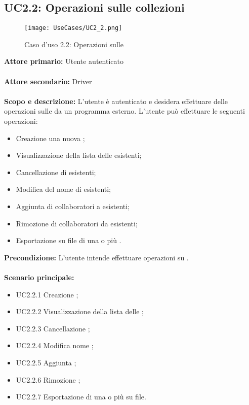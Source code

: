 \documentclass{scalatekids-article}
\begin{document}
\subsection{UC2.2: Operazioni sulle collezioni}

\begin{figure}[H]
  \begin{center}
    \texttt{[image: UseCases/UC2\_2.png]}
    \caption*{Caso d'uso 2.2: Operazioni sulle }
  \end{center}
\end{figure}
\textbf{Attore primario:} Utente autenticato\\ \\
\textbf{Attore secondario:} Driver\\ \\
\textbf{Scopo e descrizione:} L'utente è autenticato e desidera effettuare delle operazioni sulle  da un programma  esterno. L'utente può effettuare le seguenti operazioni:
\begin{itemize}
\item Creazione una nuova ;
\item Visualizzazione della lista delle  esistenti;
\item Cancellazione di  esistenti;
\item Modifica del nome di  esistenti;
\item Aggiunta di collaboratori a  esistenti;
\item Rimozione di collaboratori da  esistenti;
\item Esportazione su file di una o più .
\end{itemize}
\textbf{Precondizione:} L'utente intende effettuare operazioni su .\\ \\
\textbf{Scenario principale:}
\begin{itemize}
\item UC2.2.1 Creazione ;
\item UC2.2.2 Visualizzazione della lista delle ;
\item UC2.2.3 Cancellazione ;
\item UC2.2.4 Modifica nome ;
\item UC2.2.5 Aggiunta ;
\item UC2.2.6 Rimozione ;
\item UC2.2.7 Esportazione di una o più  su file.
\end{itemize}
\end{document}

